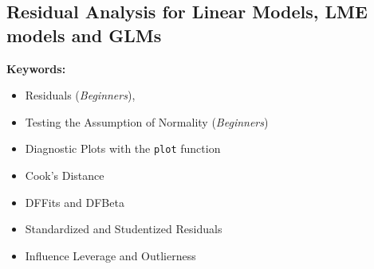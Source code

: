 \subsection{Residual Analysis for Linear Models, LME models and GLMs}

\textbf{Keywords:}

\begin{itemize}
\item Residuals (\emph{Beginners}), 
\item Testing the Assumption of Normality (\emph{Beginners})
\item Diagnostic Plots with the \texttt{plot} function
\item Cook's Distance
\item DFFits and DFBeta
\item Standardized and Studentized Residuals
\item Influence Leverage and Outlierness
\end{itemize}

